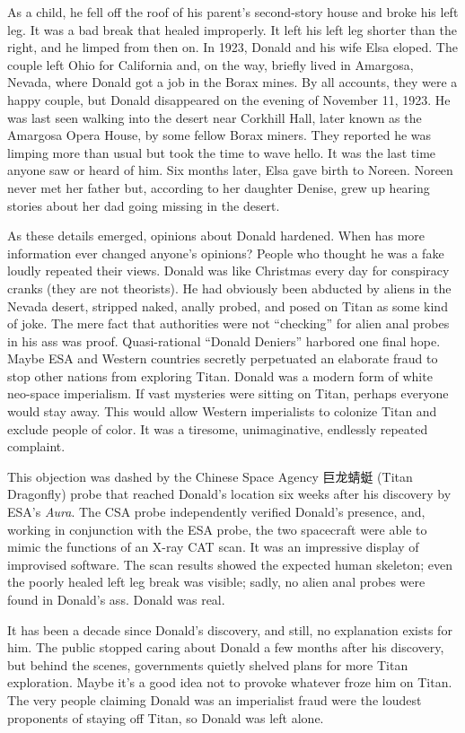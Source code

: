 As a child, he fell off the roof of his parent's second-story house and
broke his left leg. It was a bad break that healed improperly. It left
his left leg shorter than the right, and he limped from then on. In
1923, Donald and his wife Elsa eloped. The couple left Ohio for
California and, on the way, briefly lived in Amargosa, Nevada, where
Donald got a job in the Borax mines. By all accounts, they were a happy
couple, but Donald disappeared on the evening of November 11, 1923. He
was last seen walking into the desert near Corkhill Hall, later known as
the Amargosa Opera House, by some fellow Borax miners. They reported he
was limping more than usual but took the time to wave hello. It was the
last time anyone saw or heard of him. Six months later, Elsa gave birth
to Noreen. Noreen never met her father but, according to her daughter
Denise, grew up hearing stories about her dad going missing in the
desert.

As these details emerged, opinions about Donald hardened. When has more
information ever changed anyone's opinions? People who thought he was a
fake loudly repeated their views. Donald was like Christmas every day
for conspiracy cranks (they are not theorists). He had obviously been
abducted by aliens in the Nevada desert, stripped naked, anally probed,
and posed on Titan as some kind of joke. The mere fact that authorities
were not ``checking'' for alien anal probes in his ass was proof.
Quasi-rational ``Donald Deniers'' harbored one final hope. Maybe ESA and
Western countries secretly perpetuated an elaborate fraud to stop other
nations from exploring Titan. Donald was a modern form of white
neo-space imperialism. If vast mysteries were sitting on Titan, perhaps
everyone would stay away. This would allow Western imperialists to
colonize Titan and exclude people of color. It was a tiresome,
unimaginative, endlessly repeated complaint.

This objection was dashed by the Chinese Space Agency {\myAsian 巨龙蜻蜓} (Titan
Dragonfly) probe that reached Donald's location six weeks after his
discovery by ESA's \emph{Aura}. The CSA probe independently verified
Donald's presence, and, working in conjunction with the ESA probe, the
two spacecraft were able to mimic the functions of an X-ray CAT scan. It
was an impressive display of improvised software. The scan results
showed the expected human skeleton; even the poorly healed left leg
break was visible; sadly, no alien anal probes were found in Donald's
ass. Donald was real.

It has been a decade since Donald's discovery, and still, no explanation
exists for him. The public stopped caring about Donald a few months
after his discovery, but behind the scenes, governments quietly shelved
plans for more Titan exploration. Maybe it's a good idea not to provoke
whatever froze him on Titan. The very people claiming Donald was an
imperialist fraud were the loudest proponents of staying off Titan, so
Donald was left alone.

